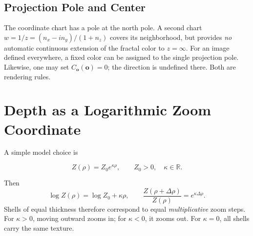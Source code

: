 \documentclass[11pt,a4paper]{article}
\numberwithin{equation}{section}
\newcommand{\R}{\mathbb R}
\newcommand{\vct}[1]{\boldsymbol{#1}}
\begin{document}
\subsection{Projection Pole and Center}
The coordinate chart has a pole at the north pole. A second chart
$w=1/z=(n_x-i n_y)/(1+n_z)$ covers its neighborhood, but provides
\emph{no} automatic continuous extension of the fractal color to $z=\infty$.
For an image defined everywhere, a fixed color can be assigned to the single
projection pole. Likewise, one may set $C_{\vct o}(\vct o)=0$; the direction
is undefined there. Both are rendering rules.

\newpage
\section{Depth as a Logarithmic Zoom Coordinate}
A simple model choice is
\begin{modelbox}
\begin{equation}\label{eq:zoom}
 Z(\rho)=Z_0e^{\kappa\rho},\qquad Z_0>0,\quad\kappa\in\R.
\end{equation}
\end{modelbox}
Then
\begin{equation}
 \log Z(\rho)=\log Z_0+\kappa\rho,\qquad
 \frac{Z(\rho+\Delta\rho)}{Z(\rho)}=e^{\kappa\Delta\rho}.
\end{equation}
Shells of equal thickness therefore correspond to equal \emph{multiplicative}
zoom steps. For $\kappa>0$, moving outward zooms in; for $\kappa<0$, it zooms out.
For $\kappa=0$, all shells carry the same texture.

\begin{center}
\end{center}
\end{document}
